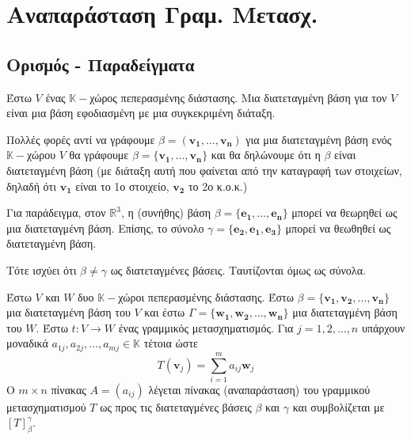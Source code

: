 



\pagestyle{vangelis}




\chapter{Αναπαράσταση Γραμ. Μετασχ.}

\section{Ορισμός - Παραδείγματα}

\begin{dfn}
  Έστω  $V$  ένας  $ \mathbb{K}- $χώρος πεπερασμένης διάστασης. Μια
  \textcolor{Col1}{διατεταγμένη βάση} για τον $V$ είναι μια βάση εφοδιασμένη με μια 
  συγκεκριμένη διάταξη.
\end{dfn}

\begin{rem}
  Πολλές φορές αντί να γράφουμε $ \beta = (\mathbf{v_{1}}, \ldots, \mathbf{v_{n}}) $ για 
  μια διατεταγμένη βάση ενός $ \mathbb{K}- $χώρου $V$ θα γράφουμε 
  $ \beta = \{ \mathbf{v_{1}}, \ldots, \mathbf{v_{n}} \} $ και θα δηλώνουμε ότι η 
  $ \beta $ είναι διατεταγμένη βάση (με διάταξη αυτή που φαίνεται από την καταγραφή 
  των στοιχείων, δηλαδή ότι $ \mathbf{v_{1}} $ είναι το 1ο στοιχείο, 
  $ \mathbf{v_{2}} $ το 2ο κ.ο.κ.) 
\end{rem}

Για παράδειγμα, στον $ \mathbb{R}^{3} $, η (συνήθης) βάση $ \beta = \{ \mathbf{e_{1}}, 
\ldots, \mathbf{e_{n}}\} $ μπορεί να θεωρηθεί ως μια διατεταγμένη βάση. 
Επίσης, το σύνολο $ \gamma = \{ \mathbf{e_{2}}, \mathbf{e_{1}}, \mathbf{e_{3}} \} $ 
μπορεί να θεωθηθεί ως διατεταγμένη βάση. 

Τότε ισχύει ότι $ \beta \neq \gamma $ ως διατεταγμένες βάσεις. 
Ταυτίζονται όμως ως σύνολα.  
\begin{dfn}
  Έστω $V$ και $W$ δυο $ \mathbb{K}- $χώροι πεπερασμένης διάστασης. Έστω $ \beta = \{
  \mathbf{v_{1}}, \mathbf{v_{2}}, \ldots, \mathbf{v_{n}} \} $ μια διατεταγμένη βάση 
  του $V$ και έστω $ \Gamma = \{ \mathbf{w_{1}}, \mathbf{w_{2}}, \ldots, 
  \mathbf{w_{n}} \} $ μια διατεταγμένη βάση του $W$. Έστω $ t \colon V \to W $ ένας 
  γραμμικός μετασχηματισμός. Για $ j = 1,2, \ldots, n $ υπάρχουν μοναδικά $ a_{1j}, 
  a_{2j}, \ldots, a_{mj} \in \mathbb{K} $ τέτοια ώστε 
  \[
    T(\mathbf{v}_{j}) = \sum_{i=1}^{m} a_{ij} \mathbf{w}_{j}  
  \] 
  Ο $ m \times n $ πίνακας $A = (a_{ij}) $ λέγεται πίνακας 
  (\textcolor{Col1}{αναπαράσταση}) του γραμμικού μετασχηματισμού $T$ ως προς τις 
  διατεταγμένες βάσεις $ \beta $ και 
  $ \gamma $ και συμβολίζεται με $ [T]_{\beta}^{\gamma} $.
\end{dfn}


